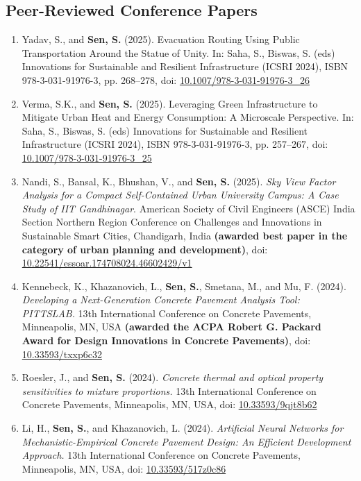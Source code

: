\documentclass[12pt]{article}
\begin{document}
\hfill
\subsection*{Peer-Reviewed Conference Papers}
\begin{enumerate}
	\item Yadav, S., and \textbf{Sen, S.} (2025). Evacuation Routing Using Public Transportation Around the Statue of Unity. In: Saha, S., Biswas, S. (eds) Innovations for Sustainable and Resilient Infrastructure (ICSRI 2024), ISBN 978-3-031-91976-3, pp. 268–278, doi: \href{https://doi.org/10.1007/978-3-031-91976-3\_26}{10.1007/978-3-031-91976-3\_26}
	\item Verma, S.K., and \textbf{Sen, S.} (2025). Leveraging Green Infrastructure to Mitigate Urban Heat and Energy Consumption: A Microscale Perspective. In: Saha, S., Biswas, S. (eds) Innovations for Sustainable and Resilient Infrastructure (ICSRI 2024), ISBN 978-3-031-91976-3, pp. 257–267, doi: \href{https://doi.org/10.1007/978-3-031-91976-3\_25}{10.1007/978-3-031-91976-3\_25}
	\item Nandi, S., Bansal, K., Bhushan, V., and \textbf{Sen, S.} (2025). \textit{Sky View Factor Analysis for a Compact Self-Contained Urban University Campus: A Case Study of IIT Gandhinagar}. American Society of Civil Engineers (ASCE) India Section Northern Region Conference on Challenges and Innovations in Sustainable Smart Cities, Chandigarh, India \textbf{(awarded best paper in the category of urban planning and development)}, doi: \href{https://doi.org/10.22541/essoar.174708024.46602429/v1}{10.22541/essoar.174708024.46602429/v1}
	\item Kennebeck, K., Khazanovich, L., \textbf{Sen, S.}, Smetana, M., and Mu, F. (2024). \textit{Developing a Next-Generation Concrete Pavement Analysis Tool: PITTSLAB.} 13th International Conference on Concrete Pavements, Minneapolis, MN, USA \textbf{(awarded the ACPA Robert G. Packard Award for Design Innovations in Concrete Pavements)}, doi: \href{https://doi.org/10.33593/txxp6c32}{10.33593/txxp6c32}
	\item Roesler, J., and \textbf{Sen, S.} (2024). \textit{Concrete thermal and optical property sensitivities to mixture proportions.} 13th International Conference on Concrete Pavements, Minneapolis, MN, USA, doi: \href{https://doi.org/10.33593/9qjt8b62}{10.33593/9qjt8b62}
	\item Li, H., \textbf{Sen, S.}, and Khazanovich, L. (2024). \textit{Artificial Neural Networks for Mechanistic-Empirical Concrete Pavement Design: An Efficient Development Approach.} 13th International Conference on Concrete Pavements, Minneapolis, MN, USA, doi: \href{https://doi.org/10.33593/517z0c86}{10.33593/517z0c86}

\end{enumerate}
\end{document}

